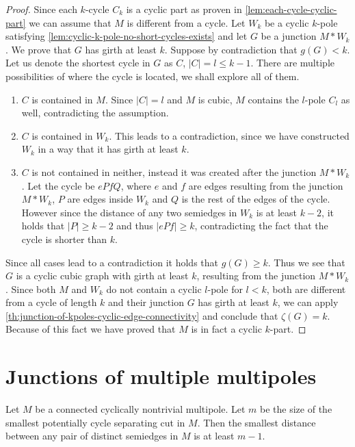 \documentclass[12pt, twoside]{book}
\begin{document}
\begin{proof}
	Since each $k$-cycle $C_k$ is a cyclic part as proven in \cref{lem:each-cycle-cyclic-part} we can assume that $M$ is different from a cycle. Let $W_k$ be a cyclic $k$-pole satisfying \cref{lem:cyclic-k-pole-no-short-cycles-exists} and let $G$ be a junction $M*W_k$. We prove that $G$ has girth at least $k$. Suppose by contradiction that $g(G)<k$. Let us denote the shortest cycle in $G$ as $C$, $|C|=l\leq k-1$. There are multiple possibilities of where the cycle is located, we shall explore all of them.
	\begin{enumerate}
		\item $C$ is contained in $M$. Since $|C|=l$ and $M$ is cubic, $M$ contains the $l$-pole $C_l$ as well, contradicting the assumption.
		\item $C$ is contained in $W_k$. This leads to a contradiction, since we have constructed $W_k$ in a way that it has girth at least $k$.
		\item $C$ is not contained in neither, instead it was created after the junction $M*W_k$. Let the cycle be $ePfQ$, where $e$ and $f$ are edges resulting from the junction $M*W_k$, $P$ are edges inside $W_k$ and $Q$ is the rest of the edges of the cycle. However since the distance of any two semiedges in $W_k$ is at least $k-2$, it holds that $|P|\geq k-2$ and thus $|ePf|\geq k$, contradicting the fact that the cycle is shorter than $k$.
	\end{enumerate}

	Since all cases lead to a contradiction it holds that $g(G)\geq k$. Thus we see that $G$ is a cyclic cubic graph with girth at least $k$, resulting from the junction $M*W_k$. Since both $M$ and $W_k$ do not contain a cyclic $l$-pole for $l<k$, both are different from a cycle of length $k$ and their junction $G$ has girth at least $k$, we can apply \cref{th:junction-of-kpoles-cyclic-edge-connectivity} and conclude that $\zeta(G)=k$. Because of this fact we have proved that $M$ is in fact a cyclic $k$-part.
\end{proof}


\section{Junctions of multiple multipoles}

\begin{lemma}\label{le:mi-implies-distance}	
	Let $M$ be a connected cyclically nontrivial multipole. Let $m$ be the size of the smallest potentially cycle separating cut in $M$. Then the smallest distance between any pair of distinct semiedges in $M$ is at least $m-1$.
\end{lemma}
\end{document}
